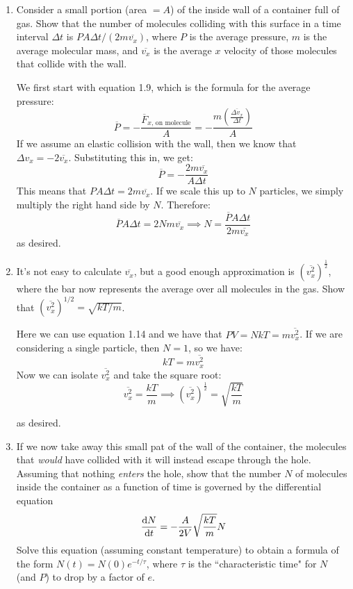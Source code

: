 \documentclass[11pt]{article}
\begin{document}
	\begin{enumerate}[label=\alph*)]
		\item Consider a small portion (area $= A$) of the inside wall of a container full of gas. Show that the 
			number of molecules colliding with this surface in a time interval $\Delta t$ is $PA \Delta t /
			(2 m \overline{v_x})$, where $P$ is the average pressure, $m$ is the average molecular mass, 
			and $\overline{v_x}$ is the average $x$ velocity of those molecules that collide with the wall.

			\begin{solution}
				We first start with equation 1.9, which is the formula for the average pressure:
				\[
				\overline P = -\frac{\overline F_{\text{$x$, on molecule}}}{A} =
				-\dfrac{m\left( \frac{\overline{\Delta v_x}}{\Delta t} \right)}{A}
				\] 
				If we assume an elastic collision with the wall, then we know that $\Delta v_x 
				= -2\overline{v_x}$. Substituting this in, we get:
				\[
					\overline P = -\frac{2m\overline{v_x}}{A\Delta t}
				\] 
				This means that $PA \Delta t = 2m \overline{v_x}$. If we scale this up to $N$ particles, we 
				simply multiply the right hand side by $N$. Therefore:
				\[
					\overline P A \Delta t = 2N m \overline{v_x} \implies N = \frac{\overline P A \Delta t}{
					2m\overline{v_x}}
				\] 
				as desired.
			\end{solution}
		\item It's not easy to calculate $\overline {v_x}$, but a good enough approximation is $(\overline{
			v_x^2})^{\frac{1}{2}}$, where the bar now represents the average over all molecules in the gas. Show 
			that $(\overline{v_x^2})^{1 / 2} = \sqrt{kT / m}$.

			\begin{solution}
				Here we can use equation 1.14 and we have that $PV = NkT = m\overline{v_x^2}$. If we are 
				considering a single particle, then $N = 1$, so we have:
				\[
					kT = m\overline{v_x^2}
				\] 
				Now we can isolate $\overline{v_x^2}$ and take the square root:
				\[
					\overline{v_x^2} = \frac{kT}{m}\implies (\overline{v_x^2})^{\frac{1}{2}} = \sqrt{\frac{kT}{m}} 
				\] 
			\end{solution}
			as desired.
		\item If we now take away this small pat of the wall of the container, the molecules that 
			\textit{would} have collided with it will instead escape through the hole. Assuming that nothing
			\textit{enters} the hole, show that the number $N$ of molecules inside the container as a function
			of time is governed by the differential equation
			\[
				\dv{N}{t} = -\frac{A}{2V}\sqrt{\frac{kT}{m}} N 
			\] 
			Solve this equation (assuming constant temperature) to obtain a formula of the form $N(t) = 
			N(0) e^{- t / \tau}$, where $\tau$ is the ``characteristic time" for $N$ (and $P$) to drop 
			by a factor of $e$.


\end{enumerate}
\end{document}
